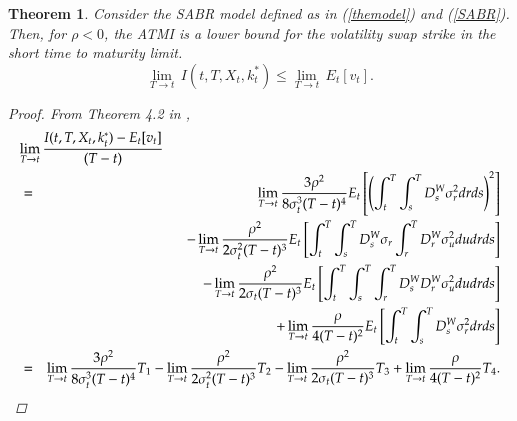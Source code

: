 \documentclass[11pt]{article}
\newtheorem{theorem}{Theorem}
\begin{document}
\begin{theorem}\label{correlatedATMI}
Consider the SABR model defined as in (\ref{themodel}) and (\ref{SABR}). Then, for $\rho < 0$, the ATMI is a lower bound for the volatility swap strike in the short time to maturity limit.
\begin{equation}
\lim_{T \to t} \, I(t,T,X_t,k^*_t) \leq \lim_{T \to t} \,  E_{t}[v_{t}].
\end{equation}
\begin{proof}
From Theorem 4.2 in \cite{AS},
\begin{eqnarray}
\label{lim1}
\lefteqn{\lim_{T\rightarrow t}\frac{I( t,T,X_t,{k}_t^*) -E_{t}[v_{t}]} {(T-t)}}\nonumber \\
&=& \lim_{T\rightarrow t}\frac{3\rho^{2}}{8\sigma _{t}^{3}(T-t)^{4}}
E_{t}\left[\left(\int_{t}^{T}\int_{s}^{T}D_{s}^{W}\sigma _{r}^{2}dr ds\right)^{2} \right]\nonumber\\
&&-\lim_{T\rightarrow t}\frac{\rho ^{2}}{{2\sigma _{t}^2(T-t)^{3}}}
E_{t}\left[ \int_{t}^{T} \int_{s}^{T}D_{s}^{W}\sigma_{r} \int_{r}^{T}D_{r}^{W}\sigma _{u}^{2}du dr ds\right]\nonumber\\
&&-\lim_{T\rightarrow t}\frac{\rho ^{2}}{2\sigma _{t}(T-t)^{3}}
E_{t}\left[\int_{t}^{T} \int_{s}^{T}\int_{r}^{T}D_{s}^{W}D_{r}^{W}\sigma _{u}^{2}du dr ds\right]\nonumber\\
&&+\lim_{T\rightarrow t}\frac{\rho}{4(T-t)^{2}}
E_{t}\left[\int_{t}^{T}\int_{s}^{T}D_{s}^{W}\sigma _{r}^{2}dr ds \right]\nonumber\\
&=& \lim_{T\rightarrow t}\frac{3\rho^{2}}{8\sigma _{t}^{3}(T-t)^{4}}T_1 - \lim_{T\rightarrow t}\frac{\rho ^{2}}{{2\sigma _{t}^2(T-t)^{3}}} T_2 - \lim_{T\rightarrow t}\frac{\rho ^{2}}{2\sigma _{t}(T-t)^{3}} T_3 +\lim_{T\rightarrow t}\frac{\rho}{4(T-t)^{2}} T_4.
\end{eqnarray}


\end{proof}
\end{theorem}
\end{document}
